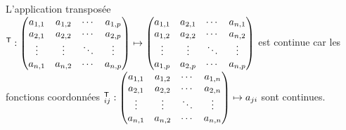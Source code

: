\documentclass{book}
\begin{document}
\begin{Exemple}[Transposée]
L'application transposée $^{\mathsf {T}}:\begin{pmatrix}a_{1,1}&a_{1,2}&\cdots &a_{1,p}\\a_{2,1}&a_{2,2}&\cdots &a_{2,p}\\\vdots &\vdots &\ddots &\vdots \\a_{n,1}&a_{n,2}&\cdots &a_{n,p}\\\end{pmatrix} \mapsto\begin{pmatrix}a_{1,1}&a_{2,1}&\cdots &a_{n,1}\\a_{1,2}&a_{2,2}&\cdots &a_{n,2}\\\vdots &\vdots &\ddots &\vdots \\a_{1,p}&a_{2,p}&\cdots &a_{n,p}\\\end{pmatrix}$ est continue car les fonctions coordonnées $^{\mathsf {T}}_{i j}:\begin{pmatrix}a_{1,1}&a_{1,2}&\cdots &a_{1,n}\\a_{2,1}&a_{2,2}&\cdots &a_{2,n}\\\vdots &\vdots &\ddots &\vdots \\a_{n,1}&a_{n,2}&\cdots &a_{n,n}\\\end{pmatrix}\mapsto a_{j i}$ sont continues.
\end{Exemple}
\end{document}
